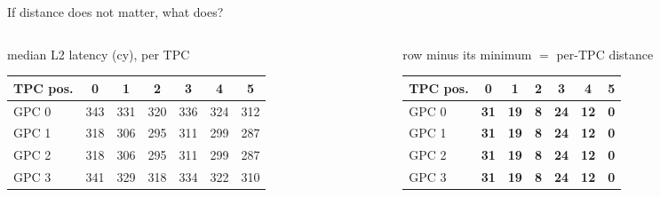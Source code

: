 \documentclass[aspectratio=169, numbering=fraction]{beamer}
\begin{document}
\begin{frame}{If distance does not matter, what does?}
  \begin{columns}[T,onlytextwidth]
  \begin{column}{0.5\textwidth}
    \centering
    {\scriptsize median L2 latency (cy), per TPC}\\[3pt]
    \scriptsize
    \begin{tabular}{lcccccc}
      \toprule
      TPC pos. & 0 & 1 & 2 & 3 & 4 & 5 \\
      \midrule
      GPC 0 & 343 & 331 & 320 & 336 & 324 & 312 \\
      GPC 1 & 318 & 306 & 295 & 311 & 299 & 287 \\
      GPC 2 & 318 & 306 & 295 & 311 & 299 & 287 \\
      GPC 3 & 341 & 329 & 318 & 334 & 322 & 310 \\
      \bottomrule
    \end{tabular}
  \end{column}
  \begin{column}{0.5\textwidth}
    \centering
    {\scriptsize row minus its minimum $=$ per-TPC distance}\\[3pt]
    \scriptsize
    \begin{tabular}{lcccccc}
      \toprule
      TPC pos. & 0 & 1 & 2 & 3 & 4 & 5 \\
      \midrule
      GPC 0 & \textbf{31} & \textbf{19} & \textbf{8} & \textbf{24} & \textbf{12} & \textbf{0} \\
      GPC 1 & \textbf{31} & \textbf{19} & \textbf{8} & \textbf{24} & \textbf{12} & \textbf{0} \\
      GPC 2 & \textbf{31} & \textbf{19} & \textbf{8} & \textbf{24} & \textbf{12} & \textbf{0} \\
      GPC 3 & \textbf{31} & \textbf{19} & \textbf{8} & \textbf{24} & \textbf{12} & \textbf{0} \\
      \bottomrule
    \end{tabular}
  \end{column}
  \end{columns}
\end{frame}
\end{document}
